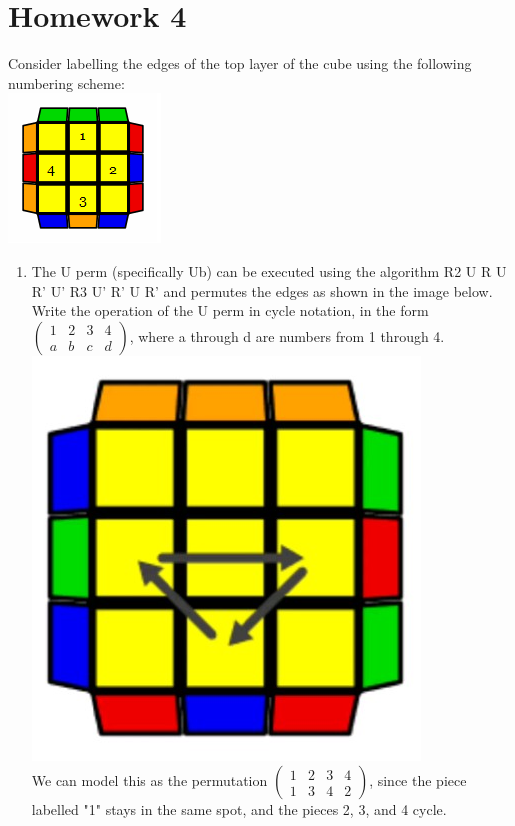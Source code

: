 \documentclass[11pt]{article}
\begin{document}
\newpage
\section{Homework 4}
Consider labelling the edges of the top layer of the cube using the following numbering scheme:\\
\includegraphics[scale=2]{numbered.png}
\begin{enumerate}
    \item The U perm (specifically Ub) can be executed using the algorithm R2 U R U R' U' R3 U' R' U R' and permutes the edges as shown in the image below. Write the operation of the U perm in cycle notation, in the form 
    $\begin{pmatrix}
    1 & 2 & 3 & 4\\
    a & b & c & d
    \end{pmatrix}$, where a through d are numbers from 1 through 4.\\
    \includegraphics[scale=0.5]{uperm.png}\\
    We can model this as the permutation 
    $\begin{pmatrix}
    1 & 2 & 3 & 4\\
    1 & 3 & 4 & 2
    \end{pmatrix}$, since the piece labelled "1" stays in the same spot, and the pieces 2, 3, and 4 cycle.
    

\end{enumerate}
\end{document}
